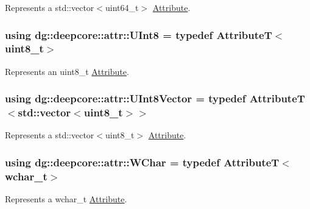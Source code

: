 Represents a {\ttfamily std\+::vector$<$uint64\+\_\+t$>$} \hyperlink{classdg_1_1deepcore_1_1_attribute}{Attribute}. 

\subsubsection[{\texorpdfstring{U\+Int8}{UInt8}}]{\setlength{\rightskip}{0pt plus 5cm}using {\bf dg\+::deepcore\+::attr\+::\+U\+Int8} = typedef AttributeT$<$uint8\+\_\+t$>$}\hypertarget{group___process_attributes_ga9ee0103d6f3e94f58f86fb9b7c17ef4d}{}\label{group___process_attributes_ga9ee0103d6f3e94f58f86fb9b7c17ef4d}


Represents an {\ttfamily uint8\+\_\+t} \hyperlink{classdg_1_1deepcore_1_1_attribute}{Attribute}. 

\subsubsection[{\texorpdfstring{U\+Int8\+Vector}{UInt8Vector}}]{\setlength{\rightskip}{0pt plus 5cm}using {\bf dg\+::deepcore\+::attr\+::\+U\+Int8\+Vector} = typedef AttributeT$<$std\+::vector$<$uint8\+\_\+t$>$$>$}\hypertarget{group___process_attributes_ga122a5889d6ae8010508171b0456ffaa0}{}\label{group___process_attributes_ga122a5889d6ae8010508171b0456ffaa0}


Represents a {\ttfamily std\+::vector$<$uint8\+\_\+t$>$} \hyperlink{classdg_1_1deepcore_1_1_attribute}{Attribute}. 

\subsubsection[{\texorpdfstring{W\+Char}{WChar}}]{\setlength{\rightskip}{0pt plus 5cm}using {\bf dg\+::deepcore\+::attr\+::\+W\+Char} = typedef AttributeT$<$wchar\+\_\+t$>$}\hypertarget{group___process_attributes_gaae8956988d8184c8612522c0f7bf95f3}{}\label{group___process_attributes_gaae8956988d8184c8612522c0f7bf95f3}


Represents a {\ttfamily wchar\+\_\+t} \hyperlink{classdg_1_1deepcore_1_1_attribute}{Attribute}. 

